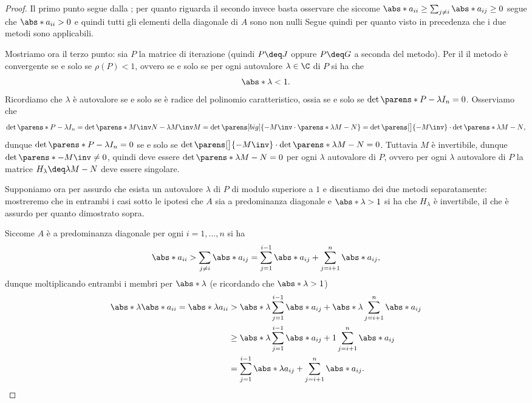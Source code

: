 \begin{proof}
    Il primo punto segue dalla ; per quanto riguarda il secondo invece basta osservare che siccome $\abs*{a_{ii}} \geq \sum_{j \neq i} \abs*{a_{ij}} \geq 0$ segue che $\abs*{a_{ii}} > 0$ e quindi tutti gli elementi della diagonale di $A$ sono non nulli Segue quindi per quanto visto in precedenza che i due metodi sono applicabili.

    Mostriamo ora il terzo punto: sia $P$ la matrice di iterazione (quindi $P \deq J$ oppure $P \deq G$ a seconda del metodo). Per il  il metodo è convergente se e solo se $\rho(P) < 1$, ovvero se e solo se per ogni autovalore $\lambda \in \C$ di $P$ si ha che \[
        \abs*{\lambda} < 1.
    \] Ricordiamo che $\lambda$ è autovalore se e solo se è radice del polinomio caratteristico, ossia se e solo se $\det \parens*{P - \lambda I_n} = 0$. Osserviamo che \begin{align*}
        \det \parens*{P - \lambda I_n} = \det \parens*{M\inv N - \lambda M\inv M} = \det \parens[big]{- M\inv \cdot \parens*{\lambda M - N}} = \det \parens[\big]{-M\inv} \cdot \det \parens*{\lambda M - N},
    \end{align*} dunque $\det\parens*{P - \lambda I_n} = 0$ se e solo se $\det \parens[\big]{-M\inv} \cdot \det \parens*{\lambda M - N} = 0$. Tuttavia $M$ è invertibile, dunque $\det \parens*{-M\inv} \neq 0$, quindi deve essere $\det\parens*{\lambda M - N} = 0$ per ogni $\lambda$ autovalore di $P$, ovvero per ogni $\lambda$ autovalore di $P$ la matrice $H_\lambda \deq \lambda M - N$ deve essere singolare.
    
    Supponiamo ora per assurdo che esista un autovalore $\lambda$ di $P$ di modulo superiore a $1$ e discutiamo dei due metodi separatamente: mostreremo che in entrambi i casi sotto le ipotesi che $A$ sia a predominanza diagonale e $\abs*{\lambda} > 1$ si ha che $H_\lambda$ è invertibile, il che è assurdo per quanto dimostrato sopra.

    Siccome $A$ è a predominanza diagonale per ogni $i = 1, \dots, n$ si ha \[
        \abs*{a_{ii}} > \sum_{j \neq i} \abs*{a_{ij}} = \sum_{j = 1}^{i-1} \abs*{a_{ij}} + \sum_{j = i+1}^n \abs*{a_{ij}},
    \] dunque moltiplicando entrambi i membri per $\abs*{\lambda}$ (e ricordando che $\abs*{\lambda} > 1$)
    \begin{align}
        \abs*{\lambda}\abs*{a_{ii}} = \abs*{\lambda a_{ii}}
        &> \abs*{\lambda}\sum_{j=1}^{i-1} \abs*{a_{ij}} + \abs*{\lambda}\sum_{j=i+1}^n \abs*{a_{ij}} \label{eq:gs_ref_pred_diag}\\
        &\geq \abs*{\lambda}\sum_{j=1}^{i-1} \abs*{a_{ij}} + 1\sum_{j=i+1}^n \abs*{a_{ij}}\nonumber\\
        &= \sum_{j=1}^{i-1} \abs*{\lambda a_{ij}} + \sum_{j=i+1}^n \abs*{a_{ij}}. \nonumber
    \end{align} 


\end{proof}
